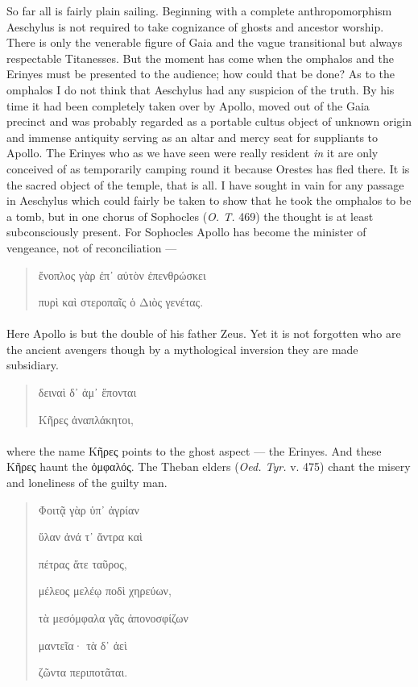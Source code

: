 \documentclass[a4paper, 11pt, oneside, polutonikogreek, english]{article}
\begin{document}
So far all is fairly plain sailing. Beginning with a complete anthropomorphism Aeschylus is not required to take cognizance of ghosts and ancestor worship. There is only the venerable figure of Gaia and the vague transitional but always respectable Titanesses. But the moment has come when the omphalos and the Erinyes must be presented to the audience; how could that be done? As to the omphalos I do not think that Aeschylus had any suspicion of the truth. By his time it had been completely taken over by Apollo, moved out of the Gaia precinct and was probably regarded as a portable cultus object of unknown origin and immense antiquity serving as an altar and mercy seat for suppliants to Apollo. The Erinyes who as we have seen were really resident \emph{in} it are only conceived of as temporarily camping round it because Orestes has fled there. It is the sacred object of the temple, that is all. I have sought in vain for any passage in Aeschylus which could fairly be taken to show that he took the omphalos to be a tomb, but in one chorus of Sophocles (\emph{O. T.} 469) the thought is at least subconsciously present. For Sophocles Apollo has become the minister of vengeance, not of reconciliation ---
\begin{quotation}
ἔνοπλος γὰρ ἐπ᾽ αὐτὸν ἐπενθρώσκει

πυρὶ καὶ στεροπαῖς ὁ Διὸς γενέτας.
\end{quotation}
\paragraph{}
Here Apollo is but the double of his father Zeus. Yet it is not forgotten who are the ancient avengers though by a mythological inversion they are made subsidiary.
\begin{quotation}
δειναὶ δ᾽ ἁμ᾽ ἕπονται

Κῆρες ἀναπλάκητοι,
\end{quotation}
\paragraph{}
where the name Κῆρες points to the ghost aspect --- the Erinyes. And these Κῆρες haunt the ὀμφαλός. The Theban elders (\emph{Oed. Tyr.} v. 475) chant the misery and loneliness of the guilty man.
\begin{quotation}
Φοιτᾷ γὰρ ὑπ᾽ ἀγρίαν

ὕλαν ἀνά τ᾽ ἄντρα καὶ

πέτρας ἅτε ταῦρος,

μέλεος μελέῳ ποδὶ χηρεύων,

τὰ μεσόμφαλα γᾶς ἀπονοσφίζων

μαντεῖα· τὰ δ᾽ ἀεὶ

ζῶντα περιποτᾶται.
\end{quotation}
\end{document}
